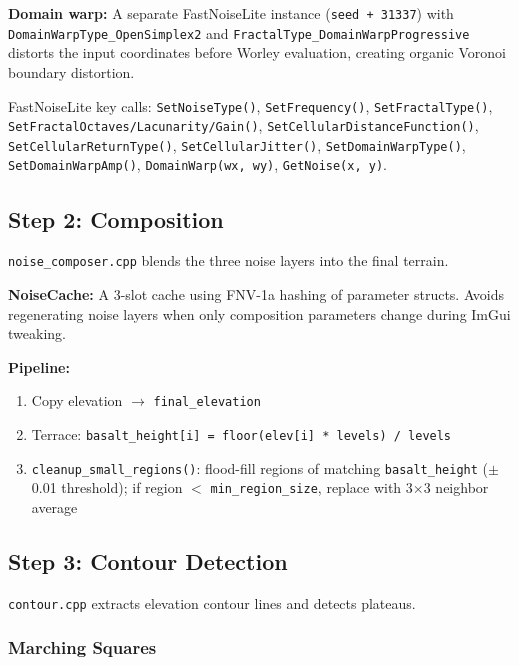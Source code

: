 \documentclass[11pt,a4paper]{article}
\begin{document}
\textbf{Domain warp:} A separate FastNoiseLite instance (\texttt{seed + 31337}) with \texttt{DomainWarpType\_OpenSimplex2} and \texttt{FractalType\_DomainWarpProgressive} distorts the input coordinates before Worley evaluation, creating organic Voronoi boundary distortion.

\begin{howtip}
FastNoiseLite key calls: \texttt{SetNoiseType()}, \texttt{SetFrequency()}, \texttt{SetFractalType()}, \texttt{SetFractalOctaves/Lacunarity/Gain()}, \texttt{SetCellularDistanceFunction()}, \texttt{SetCellularReturnType()}, \texttt{SetCellularJitter()}, \texttt{SetDomainWarpType()}, \texttt{SetDomainWarpAmp()}, \texttt{DomainWarp(wx, wy)}, \texttt{GetNoise(x, y)}.
\end{howtip}

\subsection{Step 2: Composition}
\label{sec:composition}

\texttt{noise\_composer.cpp} blends the three noise layers into the final terrain.

\textbf{NoiseCache:} A 3-slot cache using FNV-1a hashing of parameter structs. Avoids regenerating noise layers when only composition parameters change during ImGui tweaking.

\textbf{Pipeline:}
\begin{enumerate}
  \item Copy elevation $\to$ \texttt{final\_elevation}
  \item Terrace: \texttt{basalt\_height[i] = floor(elev[i] * levels) / levels}
  \item \texttt{cleanup\_small\_regions()}: flood-fill regions of matching \texttt{basalt\_height} ($\pm$0.01 threshold); if region $<$ \texttt{min\_region\_size}, replace with 3$\times$3 neighbor average
\end{enumerate}

\subsection{Step 3: Contour Detection}
\label{sec:contour}

\texttt{contour.cpp} extracts elevation contour lines and detects plateaus.

\subsubsection{Marching Squares}
\end{document}
